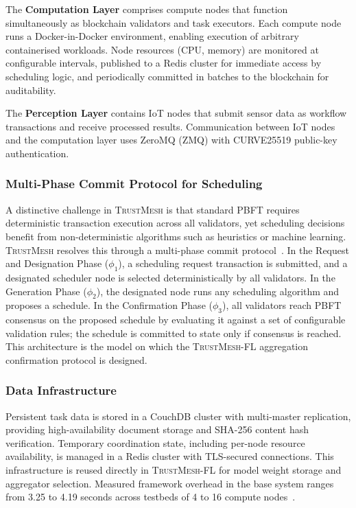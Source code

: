 \documentclass[lettersize,journal]{IEEEtran}
\newcommand{\tmfl}{\textsc{TrustMesh-FL}}
\newcommand{\tm}{\textsc{TrustMesh}}
\begin{document}
The \textbf{Computation Layer} comprises compute nodes that function simultaneously as
blockchain validators and task executors. Each compute node runs a Docker-in-Docker
environment, enabling execution of arbitrary containerised workloads. Node resources
(CPU, memory) are monitored at configurable intervals, published to a Redis cluster for
immediate access by scheduling logic, and periodically committed in batches to the
blockchain for auditability.

The \textbf{Perception Layer} contains IoT nodes that submit sensor data as workflow
transactions and receive processed results. Communication between IoT nodes and the
computation layer uses ZeroMQ (ZMQ) with CURVE25519 public-key authentication.

\subsubsection*{Multi-Phase Commit Protocol for Scheduling}

A distinctive challenge in \tm{} is that standard PBFT requires deterministic transaction
execution across all validators, yet scheduling decisions benefit from non-deterministic
algorithms such as heuristics or machine learning. \tm{} resolves this through a
multi-phase commit protocol~\cite{rangwala2025trustmesh}. In the Request and Designation
Phase ($\phi_1$), a scheduling request transaction is submitted, and a designated scheduler
node is selected deterministically by all validators. In the Generation Phase ($\phi_2$),
the designated node runs any scheduling algorithm and proposes a schedule. In the
Confirmation Phase ($\phi_3$), all validators reach PBFT consensus on the proposed schedule
by evaluating it against a set of configurable validation rules; the schedule is committed
to state only if consensus is reached. This architecture is the model on which the
\tmfl{} aggregation confirmation protocol is designed.

\subsubsection*{Data Infrastructure}

Persistent task data is stored in a CouchDB cluster with multi-master replication, providing
high-availability document storage and SHA-256 content hash verification. Temporary
coordination state, including per-node resource availability, is managed in a Redis cluster
with TLS-secured connections. This infrastructure is reused directly in \tmfl{} for model
weight storage and aggregator selection. Measured framework overhead in the base system
ranges from 3.25 to 4.19 seconds across testbeds of 4 to 16 compute nodes~\cite{rangwala2025trustmesh}.
\end{document}
